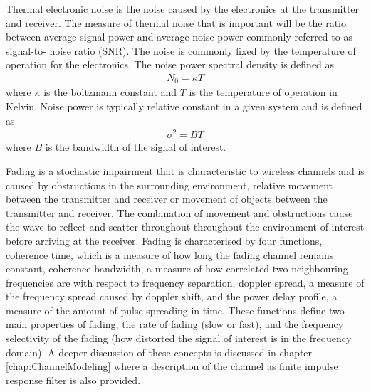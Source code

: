 Thermal electronic noise is the noise %
caused by the electronics at the %
transmitter and receiver. The measure %
of thermal noise that is important %
will be the ratio between average %
signal power and average noise power %
commonly referred to as signal-to-%
noise ratio (SNR). The noise is %
commonly fixed by the temperature %
of operation for the electronics. %
The noise power spectral density %
is defined as %
\begin{align}
	N_{0} = \kappa T
\end{align}
where $\kappa$ is the boltzmann %
constant and $T$ is the temperature %
of operation in Kelvin. Noise %
power is typically relative constant %
in a given system and is defined as
\begin{align}
	\sigma^{2} = BT
\end{align}
where $B$ is the bandwidth of the %
signal of interest.

Fading is a stochastic impairment %
that is characteristic to wireless %
channels and is caused by obstructions %
in the surrounding environment, %
relative movement between the %
transmitter and receiver %
or movement of objects between %
the transmitter and receiver. The %
combination of movement and %
obstructions cause the wave to %
reflect and scatter throughout %
throughout the environment of %
interest before arriving %
at the receiver. Fading is %
characterised by four functions, %
coherence time, which is a measure %
of how long the fading channel %
remains constant, coherence bandwidth, %
a measure of how correlated two neighbouring %
frequencies are with respect to frequency %
separation, doppler spread, a measure of %
the frequency spread caused by doppler shift, %
and the power delay profile, a measure of %
the amount of pulse spreading in time. %
These functions define two main properties %
of fading, the rate of fading (slow or fast), %
and the frequency selectivity of the fading %
(how distorted the signal of interest is %
in the frequency domain). A deeper discussion %
of these concepts is discussed in chapter %
\ref{chap:ChannelModeling} where a description %
of the channel as finite impulse response filter %
is also provided.

